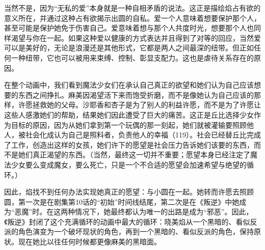 当然不是，因为“无私的爱”本身就是一种自相矛盾的说法。这正是描绘焰占有欲的意义所在，并通过这种占有欲揭示出圆的自私。爱一个人意味着想要保护那个人，甚至可能是保护她免于伤害自己。爱意味着想与那个人共度时光，想要那个人也同样渴望与你在一起。如果这种爱以健康的方式表达并且得到了对等的回应，当然爱可以是美好的，无论是浪漫还是其他形式，它都是两人之间最深的纽带。但正如任何一种纽带，它也可以被用来束缚、控制、彰显支配力。这也是虐待关系存在的原因。

在整个动画中，我们看到魔法少女们在承认自己真正的欲望和她们认为自己应该想要的东西之间挣扎。麻美因渴望活下来而饱受折磨，而不是像她认为自己应该的那样，许愿拯救她的父母。沙耶香和杏子是为了别人的利益许愿，而不是为了许愿让这些人感激她们的帮助，结果她们因此遭受了巨大的痛苦。这正是丘比选择少女作为目标的原因，因为从她们拿到第一个玩偶的那一刻起，她们就被灌输要照顾他人，被社会化成认为自己是照料者，负责他人的幸福（119）。社会已经替丘比完成了工作，创造出这样的女孩，她们许下的愿望是社会压力告诉她们该要的东西，而不是她们真正渴望的东西。（当然，最终这一切并不重要；愿望本身已经注定了魔法少女要么变成魔女，要么死亡，只是一个不合适的愿望会加速希望与绝望的循环。）

因此，焰找不到任何办法实现她真正的愿望：与小圆在一起。她转而许愿去照顾圆，第一次是在剧集第10话的“初始”时间线结尾，第二次是在《叛逆》中她成为“恶魔”时。在这两种情况下，她最终都认为唯一的出路是成为“邪恶”。因此，《叛逆》封闭了这个充满循环的动画中最大的循环：晓美焰从一个黑暗的、看似反派的角色演变为一个破坏现状的角色，再到一个黑暗的、看似反派的角色，保持原状。现在她比以往任何时候都更像麻美的黑暗面。